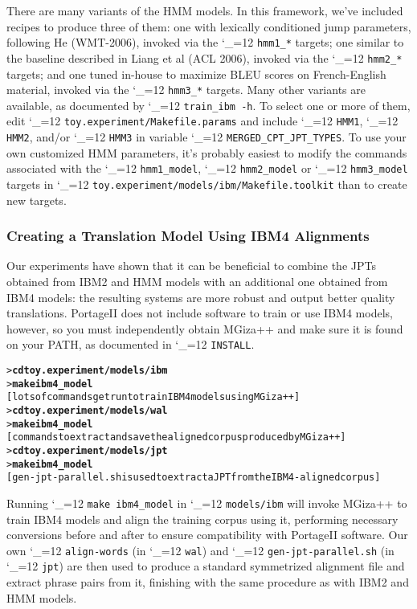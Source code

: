 \documentclass[11pt,letterpaper]{article}
\newcommand{\PS}{PortageII\xspace}
\def\code{\begingroup\catcode`\_=12 \codex}
\newcommand{\codex}[1]{\texttt{#1}\endgroup}
\begin{document}
There are many variants of the HMM models.  In this framework, we've included
recipes to produce three of them: one with lexically conditioned jump
parameters, following He (WMT-2006), invoked via the \code{hmm1_*} targets;
one similar to the baseline described in Liang et al (ACL 2006), invoked via
the \code{hmm2_*} targets; and one tuned in-house to maximize BLEU scores on
French-English material, invoked via the \code{hmm3_*} targets.  Many other
variants are available, as documented by \code{train_ibm -h}. To select one or
more of them, edit \code{toy.experiment/Makefile.params} and include
\code{HMM1}, \code{HMM2}, and/or \code{HMM3} in variable
\code{MERGED_CPT_JPT_TYPES}.
To use your own customized HMM parameters, it's probably easiest to modify the commands
associated with the \code{hmm1_model}, \code{hmm2_model} or \code{hmm3_model}
targets in \code{toy.experiment/models/ibm/Makefile.toolkit} than to create new targets.

\subsubsection{Creating a Translation Model Using IBM4 Alignments} \label{IBM4}

Our experiments have shown that it can be beneficial to combine the JPTs
obtained from IBM2 and HMM models with an additional one obtained from IBM4
models: the resulting systems are more robust and output better quality
translations.  \PS does not include software to train or use IBM4 models,
however, so you must independently obtain MGiza++ and make sure it is found on
your PATH, as documented in \code{INSTALL}.

\begin{small}
\begin{alltt}
   > \textbf{cd toy.experiment/models/ibm}
   > \textbf{make ibm4_model}
   [lots of commands get run to train IBM4 models using MGiza++]
   > \textbf{cd toy.experiment/models/wal}
   > \textbf{make ibm4_model}
   [commands to extract and save the aligned corpus produced by MGiza++]
   > \textbf{cd toy.experiment/models/jpt}
   > \textbf{make ibm4_model}
   [gen-jpt-parallel.sh is used to extract a JPT from the IBM4-aligned corpus]
\end{alltt}
\end{small}
%
Running \code{make ibm4_model} in \code{models/ibm} will invoke MGiza++ to train
IBM4 models and align the training corpus using it, performing necessary
conversions before and after to ensure compatibility with \PS software.  Our
own \code{align-words} (in \code{wal}) and \code{gen-jpt-parallel.sh} (in
\code{jpt}) are then used to produce a standard symmetrized alignment file and
extract phrase pairs from it, finishing with the same procedure as with IBM2
and HMM models.
\end{document}
